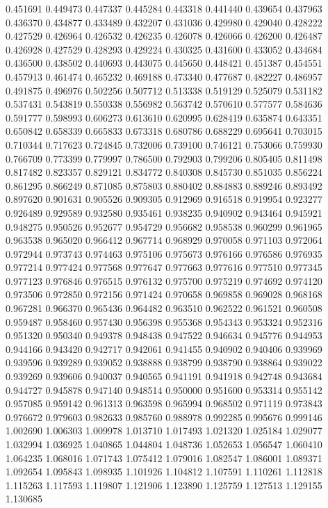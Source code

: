 0.451691
0.449473
0.447337
0.445284
0.443318
0.441440
0.439654
0.437963
0.436370
0.434877
0.433489
0.432207
0.431036
0.429980
0.429040
0.428222
0.427529
0.426964
0.426532
0.426235
0.426078
0.426066
0.426200
0.426487
0.426928
0.427529
0.428293
0.429224
0.430325
0.431600
0.433052
0.434684
0.436500
0.438502
0.440693
0.443075
0.445650
0.448421
0.451387
0.454551
0.457913
0.461474
0.465232
0.469188
0.473340
0.477687
0.482227
0.486957
0.491875
0.496976
0.502256
0.507712
0.513338
0.519129
0.525079
0.531182
0.537431
0.543819
0.550338
0.556982
0.563742
0.570610
0.577577
0.584636
0.591777
0.598993
0.606273
0.613610
0.620995
0.628419
0.635874
0.643351
0.650842
0.658339
0.665833
0.673318
0.680786
0.688229
0.695641
0.703015
0.710344
0.717623
0.724845
0.732006
0.739100
0.746121
0.753066
0.759930
0.766709
0.773399
0.779997
0.786500
0.792903
0.799206
0.805405
0.811498
0.817482
0.823357
0.829121
0.834772
0.840308
0.845730
0.851035
0.856224
0.861295
0.866249
0.871085
0.875803
0.880402
0.884883
0.889246
0.893492
0.897620
0.901631
0.905526
0.909305
0.912969
0.916518
0.919954
0.923277
0.926489
0.929589
0.932580
0.935461
0.938235
0.940902
0.943464
0.945921
0.948275
0.950526
0.952677
0.954729
0.956682
0.958538
0.960299
0.961965
0.963538
0.965020
0.966412
0.967714
0.968929
0.970058
0.971103
0.972064
0.972944
0.973743
0.974463
0.975106
0.975673
0.976166
0.976586
0.976935
0.977214
0.977424
0.977568
0.977647
0.977663
0.977616
0.977510
0.977345
0.977123
0.976846
0.976515
0.976132
0.975700
0.975219
0.974692
0.974120
0.973506
0.972850
0.972156
0.971424
0.970658
0.969858
0.969028
0.968168
0.967281
0.966370
0.965436
0.964482
0.963510
0.962522
0.961521
0.960508
0.959487
0.958460
0.957430
0.956398
0.955368
0.954343
0.953324
0.952316
0.951320
0.950340
0.949378
0.948438
0.947522
0.946634
0.945776
0.944953
0.944166
0.943420
0.942717
0.942061
0.941455
0.940902
0.940406
0.939969
0.939596
0.939289
0.939052
0.938888
0.938799
0.938790
0.938864
0.939022
0.939269
0.939606
0.940037
0.940565
0.941191
0.941918
0.942748
0.943684
0.944727
0.945878
0.947140
0.948514
0.950000
0.951600
0.953314
0.955142
0.957085
0.959142
0.961313
0.963598
0.965994
0.968502
0.971119
0.973843
0.976672
0.979603
0.982633
0.985760
0.988978
0.992285
0.995676
0.999146
1.002690
1.006303
1.009978
1.013710
1.017493
1.021320
1.025184
1.029077
1.032994
1.036925
1.040865
1.044804
1.048736
1.052653
1.056547
1.060410
1.064235
1.068016
1.071743
1.075412
1.079016
1.082547
1.086001
1.089371
1.092654
1.095843
1.098935
1.101926
1.104812
1.107591
1.110261
1.112818
1.115263
1.117593
1.119807
1.121906
1.123890
1.125759
1.127513
1.129155
1.130685
